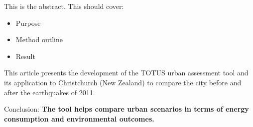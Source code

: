 This is the abstract. This should cover:
\begin{itemize}
 \item Purpose
 \item Method outline
 \item Result
\end{itemize}

This article presents the development of the TOTUS urban assessment tool and its application to Christchurch (New Zealand) to compare the city before and after the earthquakes of 2011.

Conclusion: \textbf{The tool helps compare urban scenarios in terms of energy consumption and environmental outcomes.}